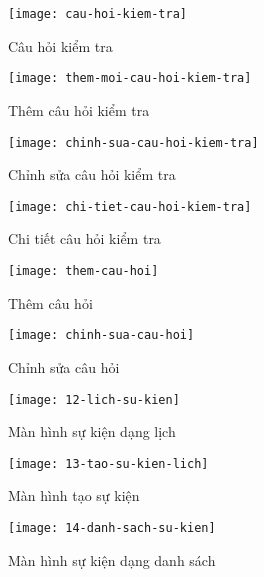 \documentclass[../Thesis.tex]{subfiles}
\begin{document}
    \begin{figure}[ht!]
        \centering\texttt{[image: cau-hoi-kiem-tra]}
        \caption{Câu hỏi kiểm tra}
        \label{fig:cau-hoi-kiem-tra}
    \end{figure}

     \begin{figure}[ht!]
        \centering\texttt{[image: them-moi-cau-hoi-kiem-tra]}
        \caption{Thêm câu hỏi kiểm tra}
        \label{fig:them-moi-cau-hoi-kiem-tra}
    \end{figure}

     \begin{figure}[ht!]
        \centering\texttt{[image: chinh-sua-cau-hoi-kiem-tra]}
        \caption{Chỉnh sửa câu hỏi kiểm tra}
        \label{fig:chinh-sua-cau-hoi-kiem-tra}
    \end{figure}

     \begin{figure}[ht!]
        \centering\texttt{[image: chi-tiet-cau-hoi-kiem-tra]}
        \caption{Chi tiết câu hỏi kiểm tra}
        \label{fig:chi-tiet-cau-hoi-kiem-tra}
    \end{figure}

     \begin{figure}[ht!]
        \centering\texttt{[image: them-cau-hoi]}
        \caption{Thêm câu hỏi}
        \label{fig:them-cau-hoi}
    \end{figure}
    
     \begin{figure}[ht!]
        \centering\texttt{[image: chinh-sua-cau-hoi]}
        \caption{Chỉnh sửa câu hỏi}
        \label{fig:chinh-sua-cau-hoi}
    \end{figure}
    

    \begin{figure}[ht!]
        \centering\texttt{[image: 12-lich-su-kien]}
        \caption{Màn hình sự kiện dạng lịch}
        \label{fig:lich-su-kien}
    \end{figure}

    \begin{figure}[ht!]
        \centering\texttt{[image: 13-tao-su-kien-lich]}
        \caption{Màn hình tạo sự kiện}
        \label{fig:thong-bao}
    \end{figure}

    \begin{figure}[ht!]
        \centering\texttt{[image: 14-danh-sach-su-kien]}
        \caption{Màn hình sự kiện dạng danh sách}
        \label{fig:lich-su-kien-danh-sach}
    \end{figure}
\end{document}
